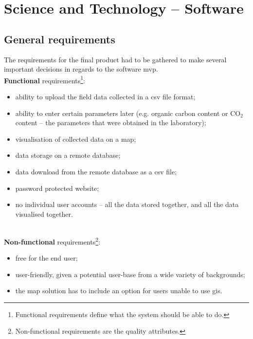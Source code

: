\chapter{Science and Technology -- Software}
 \setcounter{page}{44}
\section{General requirements}


The requirements for the final product had to be gathered to make several important decisions in regards to the software \gls{mvp}.\\

    
\textbf{Functional} requirements\footnote{Functional requirements define what the system should be able to do.}:
\begin{itemize}
    \item ability to upload the field data collected in a \gls{csv} file format;
    \item ability to enter certain parameters later (e.g. organic carbon content or CO$_{2}$ content -- the parameters that were obtained in the laboratory);
    \item visualisation of collected data on a map;
    \item data storage on a remote database;
    \item data download from the remote database as a \gls{csv} file;
    \item password protected website;
    \item no individual user accounts -- all the data stored together, and all the data visualised together.
\end{itemize} \text{} \\



\textbf{Non-functional} requirements\footnote{Non-functional requirements are the quality attributes.}:
\begin{itemize}
    \item free for the end user;
    \item user-friendly, given a potential user-base from a wide variety of backgrounds;
    \item the map solution has to include an option for users unable to use \gls{gis}.
\end{itemize}


